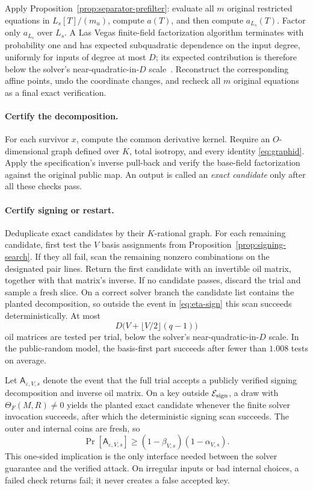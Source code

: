 \documentclass[11pt,a4paper]{article}
\theoremstyle{definition}
\theoremstyle{remark}
\newcommand{\cE}{\mathcal E}
\begin{document}
Apply Proposition~\ref{prop:separator-prefilter}: evaluate all $m$ original restricted equations in $L_s[T]/(m_u)$, compute $a(T)$, and then compute $a_{L_s}(T)$.  Factor only $a_{L_s}$ over $L_s$.  A Las Vegas finite-field factorization algorithm terminates with probability one and has expected subquadratic dependence on the input degree, uniformly for inputs of degree at most $D$; its expected contribution is therefore below the solver's near-quadratic-in-$D$ scale~\cite{KaltofenShoup}.  Reconstruct the corresponding affine points, undo the coordinate changes, and recheck all $m$ original equations as a final exact verification.

\paragraph{Certify the decomposition.}
For each survivor $x$, compute the common derivative kernel.  Require an $O$-dimensional graph defined over $K$, total isotropy, and every identity \eqref{eq:graphid}.  Apply the specification's inverse pull-back and verify the base-field factorization against the original public map.  An output is called an \emph{exact candidate} only after all these checks pass.

\paragraph{Certify signing or restart.}
Deduplicate exact candidates by their $K$-rational graph.  For each remaining candidate, first test the $V$ basis assignments from Proposition~\ref{prop:signing-search}.  If they all fail, scan the remaining nonzero combinations on the designated pair lines.  Return the first candidate with an invertible oil matrix, together with that matrix's inverse.  If no candidate passes, discard the trial and sample a fresh slice.  On a correct solver branch the candidate list contains the planted decomposition, so outside the event in \eqref{eq:eta-sign} this scan succeeds deterministically.  At most
\[
 D\bigl(V+\lfloor V/2\rfloor(q-1)\bigr)
\]
oil matrices are tested per trial, below the solver's near-quadratic-in-$D$ scale.  In the public-random model, the basis-first part succeeds after fewer than $1.008$ tests on average.

Let $\mathsf A_{\varepsilon,V,s}$ denote the event that the full trial accepts a publicly verified signing decomposition and inverse oil matrix.  On a key outside $\cE_{\rm sign}$, a draw with $\Theta_F(M,R)\ne0$ yields the planted exact candidate whenever the finite solver invocation succeeds, after which the deterministic signing scan succeeds.  The outer and internal coins are fresh, so
\begin{equation}\label{eq:acceptance-lower-bound}
\Pr[\mathsf A_{\varepsilon,V,s}]
\ge(1-\beta_{V,s})(1-\alpha_{V,s}).
\end{equation}
This one-sided implication is the only interface needed between the solver guarantee and the verified attack.  On irregular inputs or bad internal choices, a failed check returns \textsf{fail}; it never creates a false accepted key.
\end{document}
